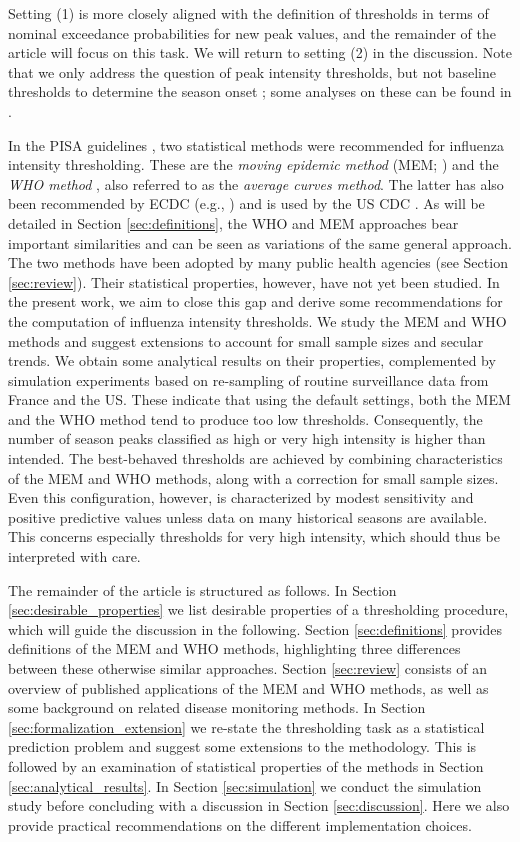 \documentclass[12pt]{article}
\begin{document}
\noindent Setting (1) is more closely aligned with the definition of thresholds in terms of nominal exceedance probabilities for new peak values, and the remainder of the article will focus on this task. We will return to setting (2) in the discussion. Note that we only address the question of peak intensity thresholds, but not baseline thresholds to determine the season onset \citep{Vega2013}; some analyses on these can be found in \cite{Pang2023}.

In the PISA guidelines \citep{WHO2017}, two statistical methods were recommended for influenza intensity thresholding. These are the \textit{moving epidemic method} (MEM; \citealt{Vega2015}) and the \textit{WHO method} \citep{WHO2014}, also referred to as the \textit{average curves method}. The latter has also been recommended by ECDC (e.g., \citealt{ECDC2017}) and is used by the US CDC \citep{Biggerstaff2017}. As will be detailed in Section \ref{sec:definitions}, the WHO and MEM approaches bear important similarities and can be seen as variations of the same general approach. The two methods have been adopted by many public health agencies (see Section \ref{sec:review}). Their statistical properties, however, have not yet been studied. In the present work, we aim to close this gap and derive some recommendations for the computation of influenza intensity thresholds. We study the MEM and WHO methods and suggest extensions to account for small sample sizes and secular trends. We obtain some analytical results on their properties, complemented by simulation experiments based on re-sampling of routine surveillance data from France and the US. These indicate that using the default settings, both the MEM and the WHO method tend to produce too low thresholds. Consequently, the number of season peaks classified as high or very high intensity is higher than intended. The best-behaved thresholds are achieved by combining characteristics of the MEM and WHO methods, along with a correction for small sample sizes. Even this configuration, however, is characterized by modest sensitivity and positive predictive values unless data on many historical seasons are available. This concerns especially thresholds for very high intensity, which should thus be interpreted with care.

The remainder of the article is structured as follows. In Section \ref{sec:desirable_properties} we list desirable properties of a thresholding procedure, which will guide the discussion in the following. Section \ref{sec:definitions} provides definitions of the MEM and WHO methods, highlighting three differences between these otherwise similar approaches. Section \ref{sec:review} consists of an overview of published applications of the MEM and WHO methods, as well as some background on related disease monitoring methods. In Section \ref{sec:formalization_extension} we re-state the thresholding task as a statistical prediction problem and suggest some extensions to the methodology. This is followed by an examination of statistical properties of the methods in Section \ref{sec:analytical_results}. In Section \ref{sec:simulation} we conduct the simulation study before concluding with a discussion in Section \ref{sec:discussion}. Here we also provide practical recommendations on the different implementation choices.
\end{document}
